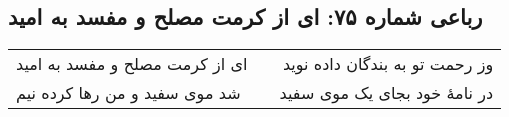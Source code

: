 \begin{center}
\section*{رباعی شماره ۷۵: ای از کرمت مصلح و مفسد به امید}
\label{sec:075}
\begin{longtable}{l p{0.5cm} r}
ای از کرمت مصلح و مفسد به امید
&&
وز رحمت تو به بندگان داده نوید
\\
شد موی سفید و من رها کرده نیم
&&
در نامهٔ خود بجای یک موی سفید
\\
\end{longtable}
\end{center}
